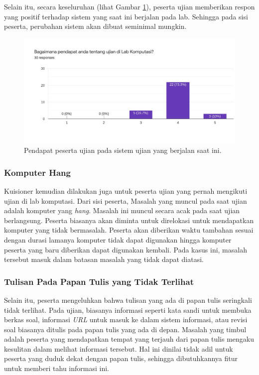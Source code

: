     Selain itu, secara keseluruhan (lihat Gambar \ref{fig:kuisioner-student-2}),
    peserta ujian memberikan respon yang positif terhadap sistem yang saat ini
    berjalan pada lab. Sehingga pada sisi peserta, perubahan sistem akan dibuat
    seminimal mungkin.

    \begin{figure}
        \centering
        \includegraphics[width=0.7\paperwidth]{Gambar/survey-student-2.pdf}
        \caption{Pendapat peserta ujian pada sistem ujian yang berjalan saat ini.}
        \label{fig:kuisioner-student-2}
    \end{figure}

    \subsubsection{Komputer Hang}\label{ref-prob-peserta-kompu-hang} Kuisioner
    kemudian dilakukan juga untuk peserta ujian yang pernah mengikuti ujian di
    lab komputasi. Dari sisi peserta, Masalah yang muncul pada saat ujian adalah
    komputer yang \textit{hang}. Masalah ini muncul secara acak pada saat ujian
    berlangsung. Peserta biasanya akan diminta untuk direlokasi untuk
    mendapatkan komputer yang tidak bermasalah. Peserta akan diberikan waktu
    tambahan sesuai dengan durasi lamanya komputer tidak dapat digunakan hingga
    komputer peserta yang baru diberikan dapat digunakan kembali. Pada kasus
    ini, masalah tersebut masuk dalam batasan masalah yang tidak dapat diatasi.
    
    \subsubsection{Tulisan Pada Papan Tulis yang Tidak
    Terlihat}\label{ref-prob-peserta-papan-tulis} Selain itu, peserta
    mengeluhkan bahwa tulisan yang ada di papan tulis seringkali tidak terlihat.
    Pada ujian, biasanya informasi seperti kata sandi untuk membuka berkas soal,
    informasi \textit{URL} untuk masuk ke dalam sistem informasi, atau revisi
    soal biasanya ditulis pada papan tulis yang ada di depan. Masalah yang
    timbul adalah peserta yang mendapatkan tempat yang terjauh dari papan tulis
    mengaku kesulitan dalam melihat informasi tersebut. Hal ini dinilai tidak
    adil untuk peserta yang duduk dekat dengan papan tulis, sehingga
    dibutuhkannya fitur untuk memberi tahu informasi ini.


